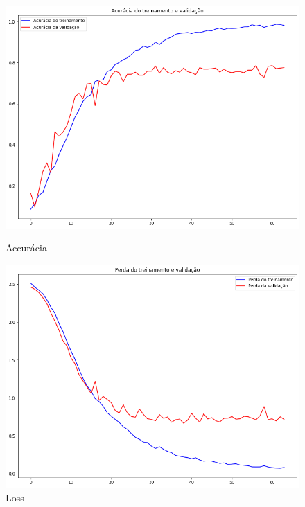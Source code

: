 \documentclass[12pt]{article}
\begin{document}
\begin{figure}[!htb]
  \begin{minipage}{.47\textwidth}
    \centering
    \includegraphics[width=1.1\linewidth]{experiments/default_noaug_64/accuracy.png}
    \caption{Accurácia}\label{fig:experiment_default_noaug_64_accuracy}
  \end{minipage}\hfill
  \begin{minipage}{.47\textwidth}
    \centering
    \includegraphics[width=1.1\linewidth]{experiments/default_noaug_64/loss.png}
    \caption{Loss}\label{fig:experiment_default_noaug_64_loss}
  \end{minipage}
\end{figure}
\end{document}
